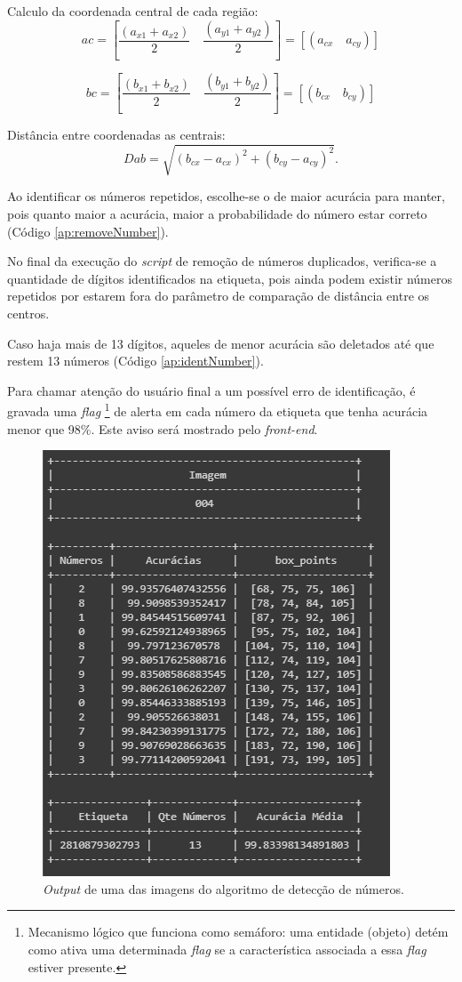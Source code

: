 Calculo da coordenada central de cada região:
\begin{equation} 
ac = [\frac{(a_{x1} + a_{x2})}{2} \quad  \frac{(a_{y1} + a_{y2})}{2}] = [(a_{cx}\quad  a_{cy})]
\label{eq: central_a}
\end{equation}

\begin{equation} 
bc = [\frac{(b_{x1} + b_{x2})}{2} \quad  \frac{(b_{y1} + b_{y2})}{2}] = [(b_{cx}\quad  b_{cy})]
\label{eq: central_b}
\end{equation}


Distância entre coordenadas as centrais:
\begin{equation} 
Dab = \sqrt{(b_{cx} - a_{cx})^2 + (b_{cy} - a_{cy})^2}.
\label{eq: euclid}
\end{equation}

Ao identificar os números repetidos, escolhe-se o de maior acurácia para manter, pois quanto maior a acurácia, maior a probabilidade do número estar correto (Código \ref{ap:removeNumber}).

No final da execução do \textit{script} de remoção de números duplicados, verifica-se a quantidade de dígitos identificados na etiqueta, pois ainda podem existir números repetidos por estarem fora do parâmetro de comparação de distância entre os centros.

Caso haja mais de 13 dígitos, aqueles de menor acurácia são deletados até que restem 13 números (Código \ref{ap:identNumber}).

Para chamar atenção do usuário final a um possível erro de identificação, é gravada uma \textit{flag}
%
\footnote{Mecanismo lógico que funciona como semáforo: uma entidade (objeto) detém como ativa uma determinada \textit{flag} se a característica associada a essa \textit{flag} estiver presente.} 
%
de alerta em cada número da etiqueta que tenha acurácia menor que 98\%. Este aviso será mostrado pelo \textit{front-end}. 

\begin{figure}[H]
	\centering
	\includegraphics[width=0.53\linewidth]{figuras/MachineLearning/imageTag.png}
	\caption{\textit{Output} de uma das imagens do algoritmo de detecção de números.}
	\label{fig:imageTag}
\end{figure}

